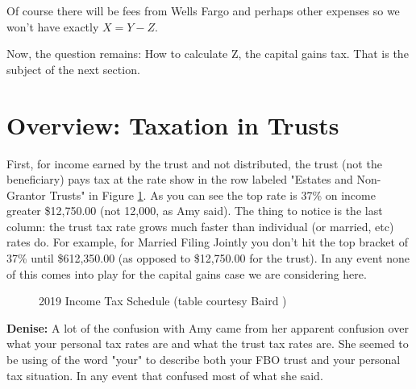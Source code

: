 \documentclass[11pt, oneside]{article}   	%
\theoremstyle{definition}
\begin{document}
\bigskip
\noindent
Of course there will be fees from Wells Fargo and perhaps other expenses so we won't have exactly $X = Y - Z$.

\bigskip
\noindent
Now, the question remains: How to calculate Z, the capital gains tax. That is the subject of the next section.

\section{Overview: Taxation in Trusts}
\label{sec:taxation_in_trust}
First,  for income earned by the trust and not distributed, the trust (not the beneficiary) pays tax at the rate show in 
the row labeled "Estates and Non-Grantor Trusts" in Figure \ref{fig:2019_income_tax_schedule}. As you can see the 
top rate is 37\% on income greater \$12,750.00 (not 12,000, as Amy said). The thing to notice is the last column: 
the trust tax rate grows much faster than individual (or married, etc) rates do. For example, for Married Filing Jointly
you don't hit the top bracket of 37\% until \$612,350.00 (as opposed to  \$12,750.00 for the trust). In any event 
none of this comes into play for the capital gains case we are considering here.

\begin{figure}
\caption{2019 Income Tax Schedule (table courtesy Baird \cite{baird2019})}
\label{fig:2019_income_tax_schedule}
\end{figure}

\bigskip
\noindent
\textbf{Denise:} A lot of the confusion with Amy came from her apparent confusion over what your personal 
tax rates are and what the trust tax rates are. She seemed to be using of the word "your" to describe both your
FBO trust and your personal tax situation. In any event that confused most of what she said.
\end{document}
